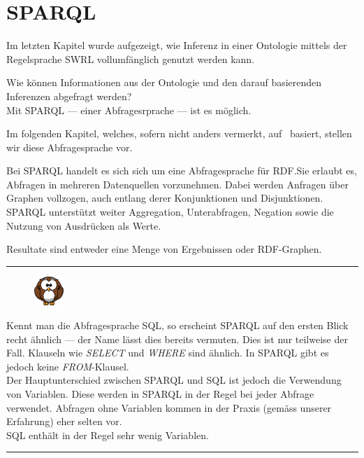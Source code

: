 \chapter{SPARQL}
\label{chap:sparql}
Im letzten Kapitel wurde aufgezeigt, wie Inferenz in einer Ontologie mittels der Regelsprache SWRL vollumfänglich genutzt werden kann.

Wie können Informationen aus der Ontologie und den darauf basierenden Inferenzen abgefragt werden?\\
Mit SPARQL --- einer Abfragesrprache --- ist es möglich.

Im folgenden Kapitel, welches, sofern nicht anders vermerkt, auf~\cite{w3sparql_querylang} basiert, stellen wir diese Abfragesprache vor.

Bei SPARQL handelt es sich sich um eine Abfragesprache für RDF.\@ Sie erlaubt es, Abfragen in mehreren Datenquellen vorzunehmen. Dabei werden Anfragen über Graphen vollzogen, auch entlang derer Konjunktionen und Disjunktionen. SPARQL unterstützt weiter Aggregation, Unterabfragen, Negation sowie die Nutzung von Ausdrücken als Werte.

Resultate sind entweder eine Menge von Ergebnissen oder RDF-Graphen.


\noindent\rule[1ex]{\textwidth}{1pt}
\begin{figure}
    \vspace{-12pt}
    \includegraphics[width=0.1\textwidth]{bilder/owl.png}
\end{figure}
Kennt man die Abfragesprache SQL, so erscheint SPARQL auf den ersten Blick recht ähnlich --- der Name lässt dies bereits vermuten. Dies ist nur teilweise der Fall. Klauseln wie \textit{SELECT} und \textit{WHERE} sind ähnlich. In SPARQL gibt es jedoch keine \textit{FROM}-Klausel.\\
Der Hauptunterschied zwischen SPARQL und SQL ist jedoch die Verwendung von Variablen.  Diese werden in SPARQL in der Regel  bei jeder Abfrage verwendet. Abfragen ohne Variablen kommen in der Praxis (gemäss unserer Erfahrung) eher selten vor.\\
SQL enthält in der Regel sehr wenig Variablen.

\noindent\rule[1ex]{\textwidth}{1pt}

